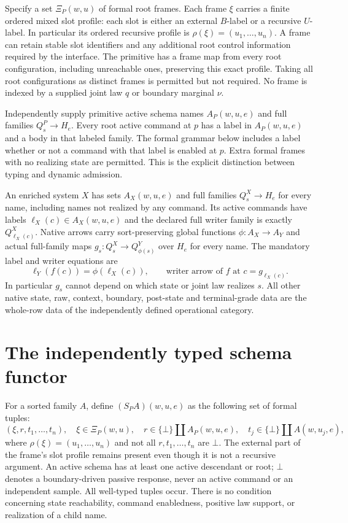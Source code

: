 \documentclass[11pt]{article}
\begin{document}
Specify a set $\Xi_P(w,u)$ of formal root frames. Each frame $\xi$ carries a finite ordered mixed slot profile: each slot is either an external $B$-label or a recursive $U$-label. In particular its ordered recursive profile is $\rho(\xi)=(u_1,\ldots,u_n)$. A frame can retain stable slot identifiers and any additional root control information required by the interface. The primitive has a frame map from every root configuration, including unreachable ones, preserving this exact profile. Taking all root configurations as distinct frames is permitted but not required. No frame is indexed by a supplied joint law $q$ or boundary marginal $\nu$.

Independently supply primitive active schema names $A_P(w,u,e)$ and full families $Q^P_s\to H_e$. Every root active command at $p$ has a label in $A_P(w,u,e)$ and a body in that labeled family. The formal grammar below includes a label whether or not a command with that label is enabled at $p$. Extra formal frames with no realizing state are permitted. This is the explicit distinction between typing and dynamic admission.

An enriched system $X$ has sets $A_X(w,u,e)$ and full families $Q^X_s\to H_e$ for every name, including names not realized by any command. Its active commands have labels $\ell_X(c)\in A_X(w,u,e)$ and the declared full writer family is exactly $Q^X_{\ell_X(c)}$. Native arrows carry sort-preserving global functions $\phi:A_X\to A_Y$ and actual full-family maps $g_s:Q^X_s\to Q^Y_{\phi(s)}$ over $H_e$ for every name. The mandatory label and writer equations are
\[
\ell_Y(f(c))=\phi(\ell_X(c)),\qquad
 \text{writer arrow of }f\text{ at }c=g_{\ell_X(c)}.
\]
In particular $g_s$ cannot depend on which state or joint law realizes $s$. All other native state, raw, context, boundary, post-state and terminal-grade data are the whole-row data of the independently defined operational category.

\section{The independently typed schema functor}
For a sorted family $A$, define $(S_PA)(w,u,e)$ as the following set of formal tuples:
\[
 (\xi,r,t_1,\ldots,t_n),\quad
 \xi\in\Xi_P(w,u),\quad
 r\in\{\bot\}\amalg A_P(w,u,e),\quad
 t_j\in\{\bot\}\amalg A(w,u_j,e),
\]
where $\rho(\xi)=(u_1,\ldots,u_n)$ and not all $r,t_1,\ldots,t_n$ are $\bot$. The external part of the frame's slot profile remains present even though it is not a recursive argument. An active schema has at least one active descendant or root; $\bot$ denotes a boundary-driven passive response, never an active command or an independent sample. All well-typed tuples occur. There is no condition concerning state reachability, command enabledness, positive law support, or realization of a child name.
\end{document}
